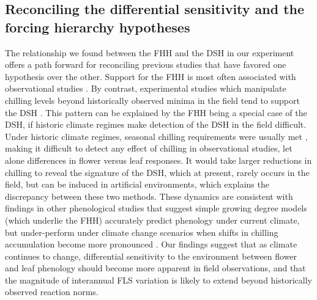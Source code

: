 \documentclass[12pt]{article}\usepackage[]{graphicx}\usepackage[]{color}
\begin{document}
\subsection*{Reconciling the differential sensitivity and the forcing hierarchy hypotheses}
\noindent The relationship we found between the FHH and the DSH in our experiment offers a path forward for reconciling previous studies that have favored one hypothesis over the other. Support for the FHH is most often associated with observational studies \citep[e.g.][]{COSMULESCU:2020aa,Guo2014}. By contrast, experimental studies which manipulate chilling levels beyond historically observed minima in the field tend to support the DSH \citep[e.g.][]{Aslani2009,Gariglio2006}. This pattern can be explained by the FHH being a special case of the DSH, if historic climate regimes make detection of the DSH in the field difficult.\\ %

\noindent Under historic climate regimes, seasonal chilling requirements were usually met \citep{Gauzere2019,Chuine:2016aa}, making it difficult to detect any effect of chilling in observational studies, let alone differences in flower versus leaf responses. It would take larger reductions in chilling to reveal the signature of the DSH, which at present, rarely occurs in the field, but can be induced in artificial environments, which explains the discrepancy between these two methods. These dynamics are consistent with findings in other phenological studies that suggest simple growing degree models (which underlie the FHH) accurately predict phenology under current climate, but under-perform under climate change scenarios when shifts in chilling accumulation become more pronounced \citep{Linkosalo2008,Chuine:2016aa}. Our findings suggest that as climate continues to change, differential sensitivity to the environment between flower and leaf phenology should become more apparent in field observations, and that the magnitude of interannual FLS variation is likely to extend beyond historically observed reaction norms.\\ 

\end{document}
